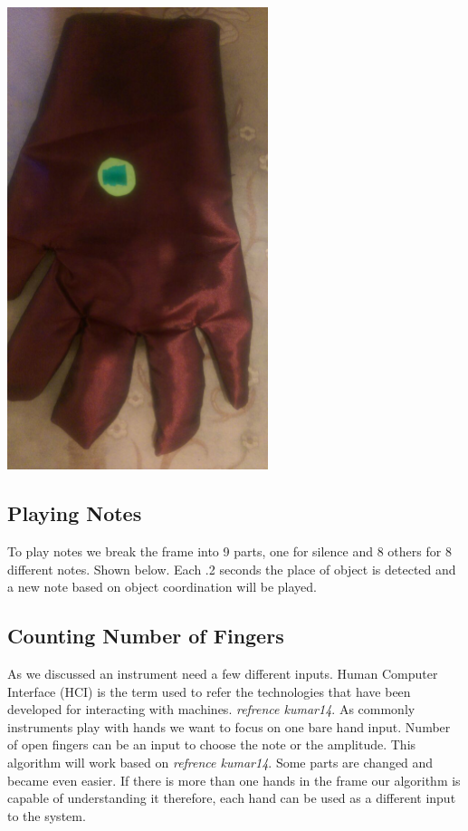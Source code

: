\documentclass{report}
\begin{document}
\begin{center}
	\includegraphics[width=3in]{Object8.jpg}
\end{center}

\subsection{Playing Notes}
To play notes we break the frame into 9 parts, one for silence and 8 others for 8 different notes. Shown below. Each .2 seconds the place of object is detected and a new note based on object coordination will be played.

\subsection{Counting Number of Fingers}
As we discussed an instrument need a few different inputs. Human Computer Interface (HCI)
is the term used to refer the technologies that have been developed for interacting with machines. \textit{refrence kumar14}. As commonly instruments play with hands we want to focus on one bare hand input. Number of open fingers can be an input to choose the note or the amplitude. This algorithm will work based on \textit{refrence kumar14}. Some parts are changed and became even easier. If there is more than one hands in the frame our algorithm is capable of understanding it therefore, each hand can be used as a different input to the system.
\end{document}
